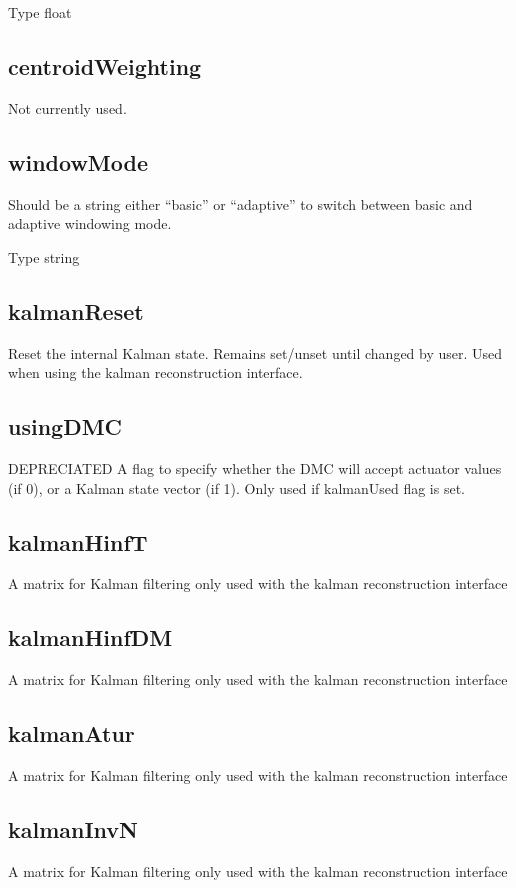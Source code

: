 \documentclass[a4,10pt]{article}
\begin{document}
Type float

\subsection{centroidWeighting}
Not currently used.

\subsection{windowMode}
Should be a string either ``basic'' or ``adaptive'' to switch between
basic and adaptive windowing mode.

Type string

\subsection{kalmanReset}
Reset the internal Kalman state.  Remains set/unset until changed by
user.  Used when using the kalman reconstruction interface.

\subsection{usingDMC}
DEPRECIATED A flag to specify whether the DMC will accept actuator values (if 0),
or a Kalman state vector (if 1).  Only used if kalmanUsed flag is set.

\subsection{kalmanHinfT}
A matrix for Kalman filtering only used with the kalman reconstruction interface

\subsection{kalmanHinfDM}
A matrix for Kalman filtering only used with the kalman reconstruction interface

\subsection{kalmanAtur}
A matrix for Kalman filtering only used with the kalman reconstruction interface

\subsection{kalmanInvN}
A matrix for Kalman filtering only used with the kalman reconstruction interface
\end{document}
